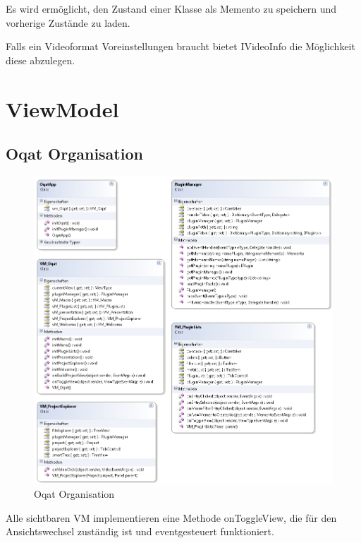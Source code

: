 Es wird ermöglicht, den Zustand einer Klasse als Memento zu speichern und vorherige Zustände zu laden.


Falls ein Videoformat Voreinstellungen braucht bietet IVideoInfo die Möglichkeit diese abzulegen.



\pagebreak
\section{ViewModel}

\subsection{Oqat Organisation}
\begin{figure}[H]
\noindent\includegraphics[width=\linewidth,height=\textheight,
keepaspectratio]{bilder/Klassendiagramm/VM.png}
\caption{Oqat Organisation}
\end{figure}

Alle sichtbaren VM implementieren eine Methode onToggleView, die für den Ansichtswechsel zuständig ist und eventgesteuert funktioniert.

